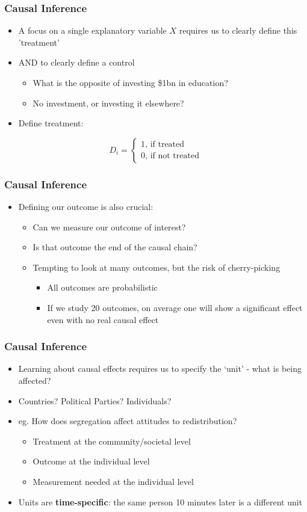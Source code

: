 \documentclass[xcolor=x11names,compress]{beamer}\usepackage[]{graphicx}\usepackage[]{color}
\renewcommand{\(}{\begin{columns}}
\renewcommand{\)}{\end{columns}}
\newcommand{\<}[1]{\begin{column}{#1}}
\renewcommand{\>}{\end{column}}
\begin{document}
\begin{frame}
\frametitle{Causal Inference}
\begin{itemize}
\item A focus on a single explanatory variable $X$ requires us to clearly define this 'treatment' 
\item AND to clearly define a control
\begin{itemize}
\item What is the opposite of investing \$1bn in education?
\item No investment, or investing it elsewhere?
\end{itemize}
\item Define treatment:
\end{itemize}
\[D_i = 
\begin{cases}
1 \text{, if treated} \\
0 \text{, if not treated}
\end{cases}
\]
\end{frame}

\begin{frame}
\frametitle{Causal Inference}
\begin{itemize}
\item Defining our outcome is also crucial:
\begin{itemize}
\item Can we measure our outcome of interest?
\item Is that outcome the end of the causal chain?
\item Tempting to look at many outcomes, but the risk of cherry-picking
\begin{itemize}
\item All outcomes are probabilistic
\item If we study 20 outcomes, on average one will show a significant effect even with no real causal effect
\end{itemize}
\end{itemize}
\end{itemize}
\end{frame}

\begin{frame}
\frametitle{Causal Inference}
\begin{itemize}
\item Learning about causal effects requires us to specify the `unit' - what is being affected?
\item Countries? Political Parties? Individuals?
\item eg. How does segregation affect attitudes to redistribution?
\begin{itemize}
\item Treatment at the community/societal level
\item Outcome at the individual level
\item Measurement needed at the individual level
\end{itemize}
\item Units are \textbf{time-specific}: the same person 10 minutes later is a different unit
\end{itemize}
\end{frame}
\end{document}
